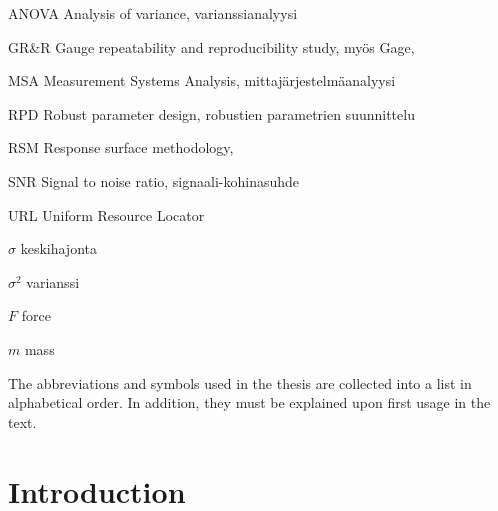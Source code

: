 \documentclass[12pt,a4paper,finnish]{tutthesis}
\begin{document}
\begin{termlist}
\item [ANOVA]      Analysis of variance, varianssianalyysi
\item [GR\&R] 	   Gauge repeatability and reproducibility study, myös Gage,
\item [MSA]        Measurement Systems Analysis, mittajärjestelmäanalyysi
\item [RPD]        Robust parameter design, robustien parametrien suunnittelu
\item [RSM]        Response surface methodology,
\item [SNR]        Signal to noise ratio, signaali-kohinasuhde
\item [URL]        Uniform Resource Locator
\end{termlist} 

\begin{termlist}
\item [$\sigma$] keskihajonta
\item [$\sigma^2$] varianssi
\item [$F$] force
\item [$m$] mass
\end{termlist} 

The abbreviations and symbols used in the thesis are collected into a
list in alphabetical order. In addition, they must be explained upon
first usage in the text.


\cleardoublepage

\newpage             %
\setcounter{page}{1} %
\renewcommand{\chaptername}{} %
\chapter{Introduction}
\label{ch:intro} 
\end{document}
